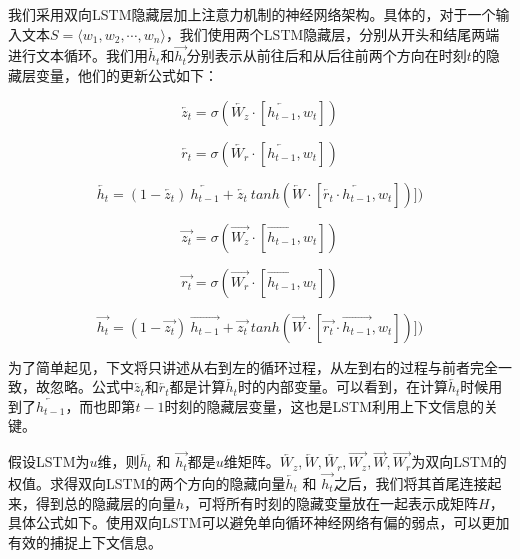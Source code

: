 \documentclass[UTF8,11pt,a4paper,nofonts]{ctexart}
\begin{document}
我们采用双向LSTM隐藏层加上注意力机制的神经网络架构。具体的，对于一个输入文本$S=\langle w_1,w_2,\cdots,w_n \rangle$，我们使用两个LSTM隐藏层，分别从开头和结尾两端进行文本循环。我们用$\overleftarrow{h_t}$和$\overrightarrow{h_t}$分别表示从前往后和从后往前两个方向在时刻$t$的隐藏层变量，他们的更新公式如下：

\begin{equation}
\overleftarrow{z_t} = \sigma(\overleftarrow{W_z} \cdot [\overleftarrow{h_{t-1}},w_t])
\end{equation}

\begin{equation}
\overleftarrow{r_t} = \sigma(\overleftarrow{W_r} \cdot [\overleftarrow{h_{t-1}},w_t])
\end{equation}

\begin{equation}
\overleftarrow{h_t} = (1- \overleftarrow{z_t})~ \overleftarrow{h_{t-1}} + \overleftarrow{z_t}~ tanh(\overleftarrow{W} \cdot [\overleftarrow{r_t} \cdot \overleftarrow{h_{t-1}},w_t])])
\end{equation}


\begin{equation}
\overrightarrow{z_t} = \sigma(\overrightarrow{W_z} \cdot [\overrightarrow{h_{t-1}},w_t])
\end{equation}

\begin{equation}
\overrightarrow{r_t} = \sigma(\overrightarrow{W_r} \cdot [\overrightarrow{h_{t-1}},w_t])
\end{equation}

\begin{equation}
\overrightarrow{h_t} = (1- \overrightarrow{z_t})~ \overrightarrow{h_{t-1}} + \overrightarrow{z_t}~ tanh(\overrightarrow{W} \cdot [\overrightarrow{r_t} \cdot \overrightarrow{h_{t-1}},w_t])])
\end{equation}

为了简单起见，下文将只讲述从右到左的循环过程，从左到右的过程与前者完全一致，故忽略。公式中$\overleftarrow{z_t}$和$\overleftarrow{r_t}$都是计算$\overleftarrow{h_t}$时的内部变量。可以看到，在计算$\overleftarrow{h_t}$时候用到了$\overleftarrow{h_{t-1}}$，而也即第$t-1$时刻的隐藏层变量，这也是LSTM利用上下文信息的关键。

假设LSTM为$u$维，则$\overleftarrow{h_t}$ 和 $\overrightarrow{h_t}$都是$u$维矩阵。$\overleftarrow{W_z}, \overleftarrow{W}, \overleftarrow{W_r}, \overrightarrow{W_z}, \overrightarrow{W}, \overrightarrow{W_r}$为双向LSTM的权值。求得双向LSTM的两个方向的隐藏向量$\overleftarrow{h_t}$ 和 $\overrightarrow{h_t}$之后，我们将其首尾连接起来，得到总的隐藏层的向量$h$，可将所有时刻的隐藏变量放在一起表示成矩阵$H$，具体公式如下。使用双向LSTM可以避免单向循环神经网络有偏的弱点，可以更加有效的捕捉上下文信息。
\end{document}
